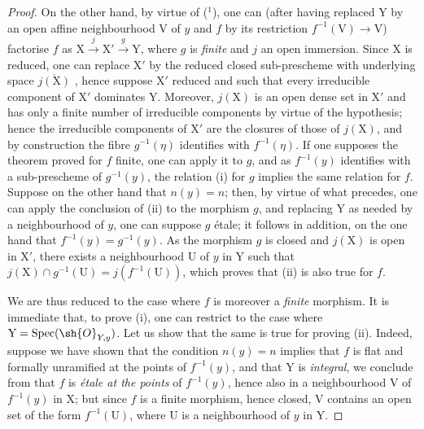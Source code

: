 \begin{proof}
On the other hand, by virtue of  (${}^1$), one can (after having replaced $\mathrm{Y}$ by an open affine neighbourhood $\mathrm{V}$ of $y$ and $f$ by its restriction $f^{-1}(\mathrm{V})\to\mathrm{V}$) factorise $f$ as $\mathrm{X}\xrightarrow{j}\mathrm{X}'\xrightarrow{g}\mathrm{Y}$, where $g$ is \emph{finite} and $j$ an open immersion.
Since $\mathrm{X}$ is reduced, one can replace $\mathrm{X}'$ by the reduced closed sub-prescheme with underlying space $\overline{j(\mathrm{X})}$ , hence suppose $\mathrm{X}'$ reduced and such that every irreducible component of $\mathrm{X}'$ dominates $\mathrm{Y}$.
Moreover, $j(\mathrm{X})$ is an open dense set in $\mathrm{X}'$ and has only a finite number of irreducible components by virtue of the hypothesis; hence  the irreducible components of $\mathrm{X}'$ are the closures of those of $j(\mathrm{X})$, and by construction the fibre $g^{-1}(\eta)$ identifies with $f^{-1}(\eta)$.
If one supposes the theorem proved for $f$ finite, one can apply it to $g$, and as $f^{-1}(y)$ identifies with a sub-prescheme of $g^{-1}(y)$, the relation (i) for $g$ implies the same relation for $f$.
Suppose on the other hand that $n(y)=n$; then, by virtue of what precedes, one can apply the conclusion of (ii) to the morphism $g$, and replacing $\mathrm{Y}$ as needed by a neighbourhood of $y$, one can suppose $g$ \'etale; it follows in addition, on the one hand that $f^{-1}(y)=g^{-1}(y)$.
As the morphism $g$ is closed and $j(\mathrm{X})$ is open in $\mathrm{X}'$, there exists a neighbourhood $\mathrm{U}$ of $y$ in $\mathrm{Y}$ such that $j(\mathrm{X})\cap g^{-1}(\mathrm{U})=j(f^{-1}(\mathrm{U}))$, which proves that (ii) is also true for $f$.

We are thus reduced to the case where $f$ is moreover a \emph{finite} morphism.
It is immediate that, to prove (i), one can restrict to the case where $\mathrm{Y}=\operatorname{Spec}(\sh{O}_{Y,y})$.
Let us show that the same is true for proving (ii).
Indeed, suppose we have shown that the condition $n(y)=n$ implies that $f$ is flat and formally unramified at the points of $f^{-1}(y)$, and that $\mathrm{Y}$ is \emph{integral}, we conclude from  that $f$ is \emph{\'etale at the points} of $f^{-1}(y)$, hence also in a neighbourhood $\mathrm{V}$ of $f^{-1}(y)$ in $\mathrm{X}$; but since $f$ is a finite morphism, hence closed, $\mathrm{V}$ contains an open set of the form $f^{-1}(\mathrm{U})$, where $\mathrm{U}$ is a neighbourhood of $y$ in $\mathrm{Y}$.


\end{proof}
